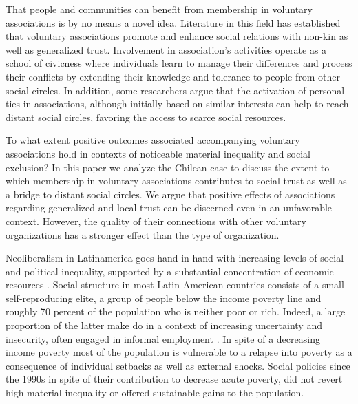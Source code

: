 That people and communities can benefit from membership in voluntary associations is by no means a novel idea. Literature in this field has established that voluntary associations promote and enhance social relations with non-kin as well as generalized trust. Involvement in association’s activities operate as a school of civicness where individuals learn to manage their differences and process their conflicts by extending their knowledge and tolerance to people from other social circles. In addition, some researchers argue that the activation of personal ties in associations, although initially based on similar interests can help to reach distant social circles, favoring the access to scarce social resources.
\bigskip
 
To what extent positive outcomes associated accompanying voluntary associations hold in contexts of noticeable material inequality and social exclusion? In this paper we analyze the Chilean case to discuss the extent to which membership in voluntary associations contributes to social trust as well as a bridge to distant social circles. We argue that positive effects of associations regarding generalized and local trust can be discerned even in an unfavorable context. However, the quality of their connections with other voluntary organizations has a stronger effect than the type of organization.
\bigskip

Neoliberalism in Latinamerica goes hand in hand with increasing levels of social and political inequality, supported by a substantial concentration of economic resources \parencite{sassen_expulsiones_2015}. Social structure in most Latin-American countries consists of a small self-reproducing elite, a group of people below the income poverty line and roughly 70  percent of the population who is neither poor or rich. Indeed, a large proportion of the latter make do in a context of increasing uncertainty and insecurity, often engaged in informal employment \parencite{lomnitz_lo_2008, portes_free-market_2005, schneider_economic_2008}. In spite of a decreasing income poverty most of the population is vulnerable to a relapse into poverty as a consequence of individual setbacks as well as external shocks. Social policies since the 1990s in spite of their contribution to decrease acute poverty, did not revert high material inequality or offered sustainable gains to the population.
\bigskip

